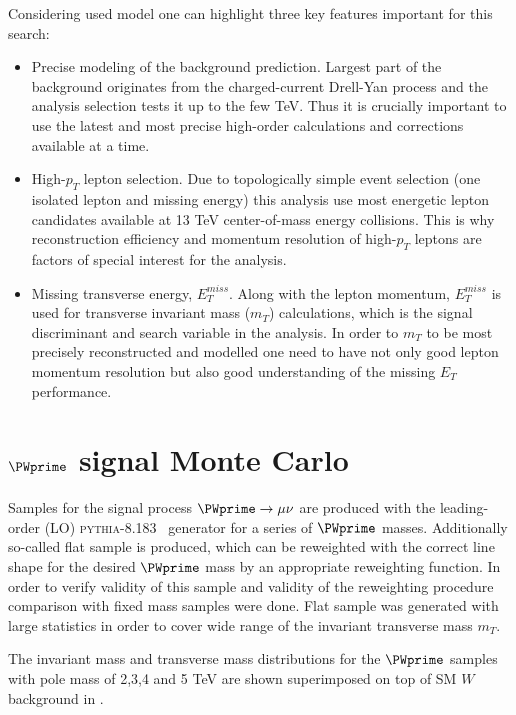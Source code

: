 Considering used model one can highlight three key features important for this search:
\begin{itemize}
 \item Precise modeling of the background prediction. 
 Largest part of the background originates from the charged-current Drell-Yan process and the analysis selection tests it up to the few TeV.
 Thus it is crucially important to use the latest and most precise high-order calculations and corrections available at a time.
 \item High-$p_T$ lepton selection. Due to topologically simple event selection (one isolated lepton and missing energy) 
 this analysis use most energetic lepton candidates available at 13 TeV center-of-mass energy collisions.
 This is why reconstruction efficiency and momentum resolution of high-$p_T$ leptons are factors of special interest for the analysis.
 \item Missing transverse energy, $E_T^{miss}$. Along with the lepton momentum, $E_T^{miss}$ is used for transverse invariant mass ($m_T$) calculations,
 which is the signal discriminant and search variable in the analysis. In order to $m_T$ to be most precisely reconstructed and modelled one need
 to have not only good lepton momentum resolution but also good understanding of the missing $E_T$ performance.
\end{itemize}


\section{$\PWprime$ signal Monte Carlo}
\label{sec:wprimeSignal} 

Samples for the signal process $\PWprime \to \mu \nu$ are produced with the leading-order (LO) 
{\scshape pythia-8.183}~\cite{pythia8} generator for a series of $\PWprime$ masses. 
Additionally so-called flat sample is produced, which can be reweighted
with the correct line shape for the desired $\PWprime$ mass by an appropriate reweighting function.
In order to verify validity of this sample and validity of the reweighting procedure comparison with fixed mass samples were done.
Flat sample was generated with large statistics in order to cover
wide range of the invariant transverse mass $m_T$.

The invariant mass and transverse mass distributions for the $\PWprime$ samples with pole mass of 2,3,4 and 5 TeV are shown superimposed on top of SM $W$ background in .

